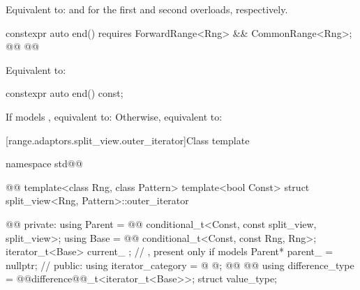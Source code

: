 {{\begin{itemdescr}
\pnum
\effects
Equivalent to:
and 
for the first and second overloads, respectively.
\end{itemdescr}
} %

%
\begin{itemdecl}
constexpr auto end()
  requires ForwardRange<Rng> && CommonRange<Rng>;
@@
  @@
\end{itemdecl}

\begin{itemdescr}
\pnum
\effects Equivalent to:
 \\
\end{itemdescr}

{\color{newclr}
%
\begin{itemdecl}
constexpr auto end() const;
\end{itemdecl}

\begin{itemdescr}
\pnum
\effects
If  models , equivalent to: 
Otherwise, equivalent to: 
\end{itemdescr}
} %

[range.adaptors.split_view.outer_iterator]{Class template }

\pnum
\begin{note}
\end{note}

\begin{codeblock}
namespace std@@ { @@
  template<class Rng, class Pattern>
  template<bool Const>
  struct split_view<Rng, Pattern>::outer_iterator { @\newtxt{// \expos}@
  private:
    using Parent =                @\newtxt{// \expos}@
      conditional_t<Const, const split_view, split_view>;
    using Base   =                @\newtxt{// \expos}@
      conditional_t<Const, const Rng, Rng>;
    iterator_t<Base> current_ {}; // \expos, present only if  models 
    Parent* parent_ = nullptr;    // \expos
  public:
    using iterator_category = @ \oldtxt{\seebelownc}@;
    @@
      @@
    using difference_type   = @@difference@@_t<iterator_t<Base>>;
    struct value_type;

}}
\end{codeblock}}
